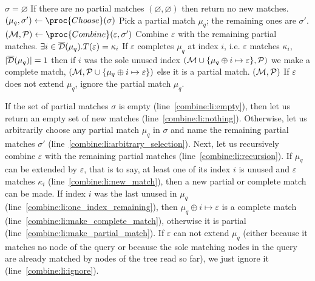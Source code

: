 \begin{codebox}
\li	\If \(\sigma = \varnothing\)
\label{combine:li:empty}
\RComment If there are no partial matches
\li	\Then \Return \((\varnothing, \varnothing)\)
\label{combine:li:nothing}
\RComment then return no new matches.
	\End
\li	\((\mu_q, \sigma') \gets \proc{Choose} (\sigma)\)
\label{combine:li:arbitrary_selection}
\RComment Pick a partial match \(\mu_q\); the remaining ones are \(\sigma'\).
\li \(({\cal M}, {\cal P}) \gets 
      \proc{Combine} (\varepsilon, \sigma')\)
\label{combine:li:recursion}
\RComment Combine \(\varepsilon\) with the remaining partial matches.
\li	\If \(\exists i \in \overline{\cal D}(\mu_q).T(\varepsilon) = \kappa_i\)
\label{combine:li:new_match}
\RComment If \(\varepsilon\) completes \(\mu_q\) at index \(i\),
i.e. \(\varepsilon\) matches \(\kappa_i\),
\li	\Then \If \(|\overline{\cal D}(\mu_q)| = 1\)
\label{combine:li:one_index_remaining}
\RComment then if \(i\) was the sole unused index
\li       \Then \Return \(({\cal M} \cup \{\mu_q \oplus i \mapsto
                          \varepsilon\}, {\cal P})\)
\label{combine:li:make_complete_match}
\RComment we make a complete match,
          \End
\li       \Return \(({\cal M}, 
                     {\cal P} \cup \{\mu_q \oplus i \mapsto
                     \varepsilon\})\)
\label{combine:li:make_partial_match}
\RComment else it is a partial match.
	\End
\li	\Return \(({\cal M}, {\cal P})\)
\label{combine:li:ignore}
\RComment If \(\varepsilon\) does not extend \(\mu_q\), ignore the
partial match \(\mu_q\).
\end{codebox}
If the set of partial matches \(\sigma\) is empty
(line~\ref{combine:li:empty}), then let us return an empty set of new
matches (line~\ref{combine:li:nothing}). Otherwise, let us arbitrarily
choose any partial match \(\mu_q\) in \(\sigma\) and name the
remaining partial matches \(\sigma'\)
(line~\ref{combine:li:arbitrary_selection}). Next, let us recursively
combine \(\varepsilon\) with the remaining partial matches
(line~\ref{combine:li:recursion}). If \(\mu_q\) can be extended by
\(\varepsilon\), that is to say, at least one of its index \(i\) is
unused and \(\varepsilon\) matches \(\kappa_i\)
(line~\ref{combine:li:new_match}), then a new partial or complete
match can be made. If index \(i\) was the last unused in \(\mu_q\)
(line~\ref{combine:li:one_index_remaining}), then \(\mu_q \oplus i
\mapsto \varepsilon\) is a complete match
(line~\ref{combine:li:make_complete_match}), otherwise it is partial
(line~\ref{combine:li:make_partial_match}). If \(\varepsilon\) can not
extend \(\mu_q\) (either because it matches no node of the query or
because the sole matching nodes in the query are already matched by
nodes of the \XML tree read so far), we just ignore it
(line~\ref{combine:li:ignore}).


